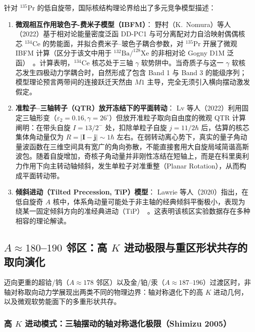 针对 $^{135}\mathrm{Pr}$ 的低自旋带，国际核结构理论界给出了多元竞争模型描述：
\begin{enumerate}
\item \textbf{微观相互作用玻色子-费米子模型（IBFM）}：
野村（K.~Nomura）等人（2022）基于相对论能量密度泛函 DD-PC1 与可分离配对力自洽映射偶偶核芯 $^{134}\mathrm{Ce}$ 的势能面，并拟合费米子--玻色子耦合参数，对 $^{135}\mathrm{Pr}$ 开展了微观 IBFM 计算（区分于该文中用于 $^{132}\mathrm{Ba} / ^{128}\mathrm{Xe}$ 的非相对论 Gogny D1M 泛函）~\cite{nomura-2022-questioning-wobbling-ibfm}。计算表明，$^{134}\mathrm{Ce}$ 核芯处于三轴 $\gamma$ 软势阱中。当奇质子与这一 $\gamma$ 软核芯发生四极动力学耦合时，自然形成了包含 Band 1 与 Band 3 的能级序列；模型理论预言两带间的连接跃迁天然由 $M1$ 主导，完全无须引入横向摆动激发假定。
\item \textbf{准粒子--三轴转子（QTR）放开冻结下的平面转动}：
Lv 等人（2022）利用固定三轴形变（$\varepsilon_2 = 0.16, \gamma = 26^\circ$）但放开准粒子取向自由度的微观 QTR 计算阐明：在带头自旋 $I = 13/2^-$ 处，扣除单粒子自旋 $j = 11/2\hbar$ 后，估算的核芯集体角动量仅为 $R = |\mathbf{I} - \mathbf{j}| \sim 1\hbar$ 左右。在弱转动离心势下，真实的量子角动量波函数在三维空间具有宽广的角向弥散，不能直接套用大自旋局域简谐高斯波包。随着自旋增加，奇核子角动量并非刚性冻结在短轴上，而是在科里奥利力作用下向主转动轴倾斜，发生单粒子对准重整（Planar Rotation），从而构成平面转动带。
\item \textbf{倾斜进动（Tilted Precession, TiP）模型}：
Lawrie 等人（2020）指出，在低自旋奇 $A$ 核中，体系角动量可能处于非主轴的经典倾斜平衡极小，表现为绕某一固定倾斜方向的准经典进动（TiP）~\cite{lawrie-2020-tilted-precession-wobbling}。这表明该核区实验数据存在多种相容的理论解读。
\end{enumerate}

\subsection{$A\approx 180$--$190$ 邻区：高 $K$ 进动极限与重区形状共存的取向演化}\label{sec:4-4-4}

迈向更重的超铪/钨（$A\approx 178$ 邻区）以及金/铂/汞（$A\approx 187$--$196$）过渡区时，非轴对称取向动力学展现出两类不同的物理边界：轴对称退化下的高 $K$ 进动几何，以及微观软势能面下的多重形状共存。

\subsubsection{高 $K$ 进动模式：三轴摆动的轴对称退化极限（Shimizu 2005）}

